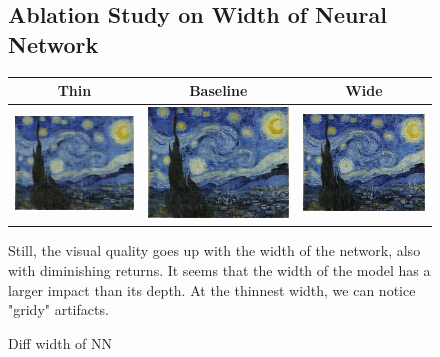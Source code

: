 \documentclass{article}
\begin{document}
\begin{figure}[h]
    \subsection{Ablation Study on Width of Neural Network}
    \begin{tabular}{c c c}
       Thin  & Baseline &  Wide\\ 
       \midrule
    \includegraphics[width=0.3\linewidth]{pe-15-thin-norm-pred.png} & \includegraphics[width=0.3\linewidth]{no-15-norm-norm-pred.png} &
        \includegraphics[width=0.3\linewidth]{pe-15-wide-norm-pred.png}
    \end{tabular}
    \caption{Diff width of NN}

Still, the visual quality goes up with the width of the network, also with diminishing returns. It seems that the width of the model has a larger impact than its depth. At the thinnest width, we can notice "gridy" artifacts.
\end{figure}
\end{document}
